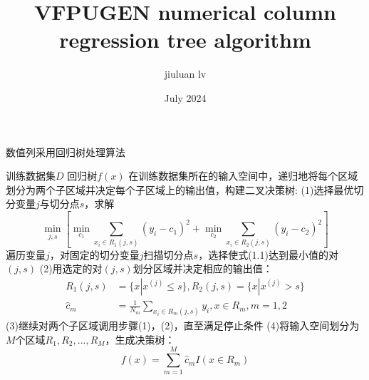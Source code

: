 \documentclass{article}
\title{VFPUGEN numerical column regression tree algorithm}
\author{jiuluan lv}
\date{July 2024}
\numberwithin{equation}{algorithm}
\begin{document}
	
	\maketitle
	
	\begin{algorithm}
		\caption{数值列采用回归树处理算法}
		\begin{algorithmic}[0]
			\Require 训练数据集$D$
			\Ensure 回归树$f(x)$
			\State 在训练数据集所在的输入空间中，递归地将每个区域划分为两个子区域并决定每个子区域上的输出值，构建二叉决策树:
			\State (1)选择最优切分变量$j$与切分点$s$，求解
			\begin{equation}
				\min_{j,s} \left[ \min_{c_1} \sum_{x_i \in R_1(j,s)} (y_i - c_1)^2 + \min_{c_2} \sum_{x_i \in R_2(j,s)} (y_i - c_2)^2 \right]
			\end{equation}
			遍历变量$j$，对固定的切分变量$j$扫描切分点$s$，选择使式(1.1)达到最小值的对$(j,s)$
			\State (2)用选定的对$(j,s)$划分区域并决定相应的输出值：
			\begin{align}
				R_1(j,s) &= \{ x|x^{(j)} \le s \}, R_2(j,s) = \{ x|x^{(j)} > s \} \\
				\hat{c}_m &= \frac{1}{N_m}\sum_{x_i \in R_m(j,s)} y_i, x \in R_m, m = 1,2
			\end{align}
			\State (3)继续对两个子区域调用步骤(1)，(2)，直至满足停止条件
			\State (4)将输入空间划分为$M$个区域$R_1,R_2,...,R_M$，生成决策树：
			\begin{equation}
				f(x) = \sum_{m = 1}^M \hat{c}_mI(x \in R_m)
			\end{equation}
		\end{algorithmic}
	\end{algorithm}
	
\end{document}
